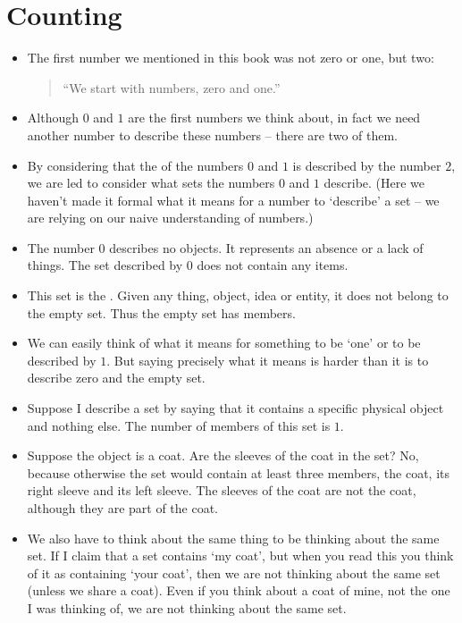 \chapter{Counting}
\label{counting}


\begin{itemize}
\item
The first number we mentioned in this book was not zero or one, but two:
\begin{quote}
``We start with  numbers, zero and one.''
\end{quote}
\item
Although $0$ and $1$ are the first numbers we think about, in fact we need another number to describe these numbers -- there are two of them.
\item
By considering that the  of the numbers $0$ and $1$ is described by the number $2$, we are led to consider what sets the numbers $0$ and $1$ describe. (Here we haven't made it formal what it means for a number to `describe' a set -- we are relying on our naive understanding of numbers.)
\item
The number $0$ describes no objects. It represents an absence or a lack of things. The set described by $0$ does not contain any items.
\item
This set is the . Given any thing, object, idea or entity, it does not belong to the empty set. Thus the empty set has  members.
\item
  We can easily think of what it means for something to be `one' or to be described by $1$. But saying precisely what it means is harder than it is to describe zero and the empty set.
\item
Suppose I describe a set by saying that it contains a specific physical object and nothing else. The number of members of this set is $1$. 
\item
Suppose the object is a coat. Are the sleeves of the coat in the set? No, because otherwise the set would contain at least three members, the coat, its right sleeve and its left sleeve. The sleeves of the coat are not the coat, although they are part of the coat.
\item
We also have to think about the same thing to be thinking about the same set. If I claim that a set contains `my coat', but when you read this you think of it as containing `your coat', then we are not thinking about the same set (unless we share a coat). Even if you think about a coat of mine, not the one I was thinking of, we are not thinking about the same set.

\end{itemize}
